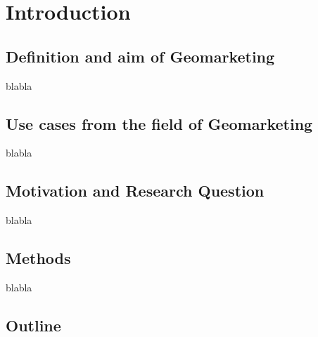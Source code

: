 \section{Introduction}

\subsection{Definition and aim of Geomarketing}
blabla

\subsection{Use cases from the field of Geomarketing}
blabla

\subsection{Motivation and Research Question}
blabla

\subsection{Methods}
blabla

\subsection{Outline}